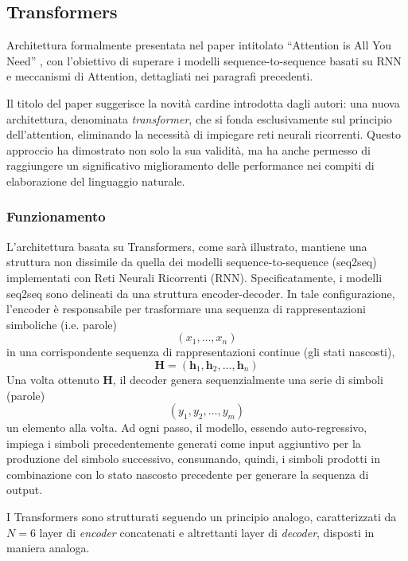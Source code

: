 \documentclass[12pt,a4paper,twoside,openright]{book}
\begin{document}
\subsection{Transformers}
Architettura formalmente presentata nel paper intitolato ``Attention is All You Need'' \cite{DBLP:journals/corr/VaswaniSPUJGKP17}, con l'obiettivo di superare i modelli sequence-to-sequence basati su RNN e meccanismi di Attention, dettagliati nei paragrafi precedenti. 

Il titolo del paper suggerisce la novità cardine introdotta dagli autori: una nuova architettura, denominata \emph{transformer}, che si fonda esclusivamente sul principio dell'attention, eliminando la necessità di impiegare reti neurali ricorrenti. Questo approccio ha dimostrato non solo la sua validità, ma ha anche permesso di raggiungere un significativo miglioramento delle performance nei compiti di elaborazione del linguaggio naturale.

\subsubsection{Funzionamento} L'architettura basata su Transformers, come sarà illustrato, mantiene una struttura non dissimile da quella dei modelli sequence-to-sequence (seq2seq) implementati con Reti Neurali Ricorrenti (RNN). Specificatamente, i modelli seq2seq sono delineati da una struttura encoder-decoder. In tale configurazione, l'encoder è responsabile per trasformare una sequenza di rappresentazioni simboliche (i.e. parole) 
\begin{equation*}
(x_1, \dots, x_n)
\end{equation*}
in una corrispondente sequenza di rappresentazioni continue (gli stati nascosti),
\begin{equation*}
\mathbf{H} = (\mathbf{h}_1, \mathbf{h}_2, \dots, \mathbf{h}_n)
\end{equation*}
Una volta ottenuto $\mathbf{H}$, il decoder genera sequenzialmente una serie di simboli (parole)
\begin{equation*}
(y_1,y_2, \dots, y_m)
\end{equation*}
un elemento alla volta. Ad ogni passo, il modello, essendo auto-regressivo, impiega i simboli precedentemente generati come input aggiuntivo per la produzione del simbolo successivo, consumando, quindi, i simboli prodotti in combinazione con lo stato nascosto precedente per generare la sequenza di output.

I Transformers sono strutturati seguendo un principio analogo, caratterizzati da $N=6$ layer di \emph{encoder} concatenati e altrettanti layer di \emph{decoder}, disposti in maniera analoga.
\end{document}
